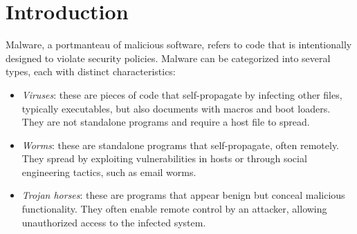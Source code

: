 \section{Introduction}

Malware, a portmanteau of malicious software, refers to code that is intentionally designed to violate security policies. 
Malware can be categorized into several types, each with distinct characteristics:
\begin{itemize}
    \item \textit{Viruses}: these are pieces of code that self-propagate by infecting other files, typically executables, but also documents with macros and boot loaders. 
        They are not standalone programs and require a host file to spread.
    \item \textit{Worms}: these are standalone programs that self-propagate, often remotely. 
        They spread by exploiting vulnerabilities in hosts or through social engineering tactics, such as email worms.
    \item \textit{Trojan horses}: these are programs that appear benign but conceal malicious functionality. 
        They often enable remote control by an attacker, allowing unauthorized access to the infected system.
\end{itemize}

